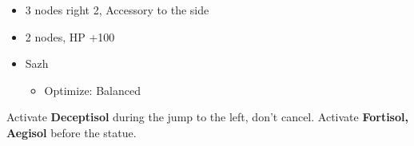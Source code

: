 \begin{multicols}{2}
\begin{menu}
\begin{itemize}
\begin{itemize}
\begin{itemize}
\begin{itemize}
                        \item 3 nodes right 2, Accessory to the side
                        \item 2 nodes, HP +100
                      \end{itemize}
              \end{itemize}
      \end{itemize}
      \equip
      \begin{itemize}
        \item Sazh
              \begin{itemize}
                \item Optimize: Balanced
              \end{itemize}
      \end{itemize}
    \end{itemize}
  \end{menu}

  Activate \textbf{Deceptisol} during the jump to the left, don't cancel.
  Activate \textbf{Fortisol, Aegisol} before the statue.
  \vfill



\end{multicols}
